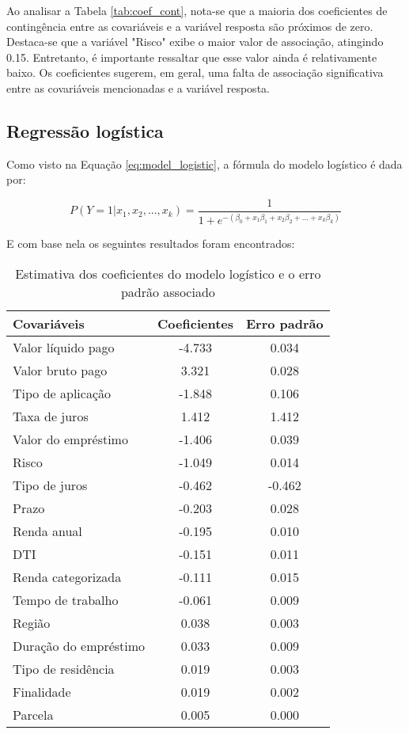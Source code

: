 Ao analisar a Tabela \ref{tab:coef_cont}, nota-se que a maioria dos coeficientes de contingência entre as 
covariáveis e a variável resposta são próximos de zero. Destaca-se que a variável "Risco"
exibe o maior valor de associação, atingindo 0.15. Entretanto, é importante ressaltar que esse valor
ainda é relativamente baixo. Os coeficientes sugerem, em geral, uma falta de associação significativa 
entre as covariáveis mencionadas e a variável resposta.


\subsection{Regressão logística}

Como visto na Equação \ref{eq:model_logistic}, a fórmula do modelo logístico é dada por:

\begin{equation}
  P(Y=1| x_1, x_2, ..., x_k) = \frac{1}{1 + e^{-(\beta_0 + x_{1}\beta_1 + x_{2}\beta_2 + \ldots + x_{k}\beta_k)}}
\end{equation}

E com base nela os seguintes resultados foram encontrados:


\begin{table}[H]
\centering
\begin{tabular}{lcc}
  \toprule
    \textbf{Covariáveis} & \textbf{Coeficientes} &  \textbf{Erro padrão} \\
  \midrule
        Valor líquido pago & -4.733 &  0.034 \\
        Valor bruto pago &  3.321 &  0.028 \\
        Tipo de aplicação & -1.848 &  0.106 \\
        Taxa de juros &  1.412 &  1.412 \\
        Valor do empréstimo & -1.406 &  0.039 \\
        Risco & -1.049 &  0.014 \\
        Tipo de juros & -0.462 &  -0.462  \\
        Prazo & -0.203 &  0.028 \\
        Renda anual & -0.195 &  0.010 \\
        DTI & -0.151 &  0.011 \\
        Renda categorizada & -0.111 &  0.015 \\
        Tempo de trabalho & -0.061 &  0.009 \\
        Região &  0.038 &  0.003\\
        Duração do empréstimo &  0.033 &  0.009 \\
        Tipo de residência &  0.019 &  0.003 \\
        Finalidade &  0.019 &  0.002  \\
        Parcela &  0.005 &  0.000  \\
  \bottomrule
\end{tabular}
\caption{Estimativa dos coeficientes do modelo logístico e o erro padrão associado}
\label{tab:result_model_logist}
\end{table}

